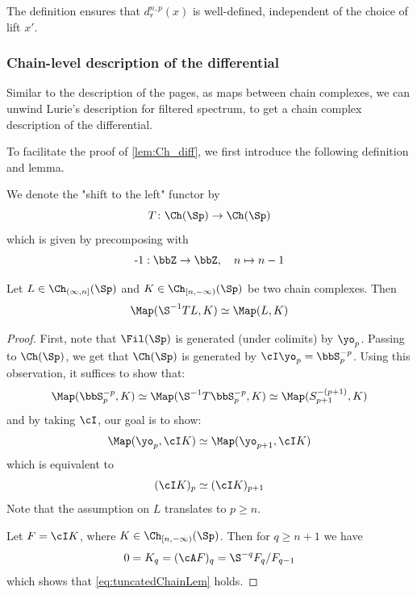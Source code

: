 The definition ensures that $d_r^{n,p}(x)$ is well-defined, independent of the choice of lift $x'$.


\subsubsection*{Chain-level description of the differential}

Similar to the description of the pages, as maps between chain complexes, we can unwind Lurie's description for filtered spectrum, to get a chain complex description of the differential.

To facilitate the proof of \cref{lem:Ch_diff}, we first introduce the following definition and lemma.

\begin{defn}
    We denote the "shift to the left" functor by 
    \begin{equation*}
        T \colon \Ch(\Sp) \to \Ch(\Sp)
    \end{equation*}
    which is given by precomposing with 
    \begin{equation*}
        \operatorname{-1}: \bbZ \to \bbZ, \quad n \mapsto n-1
    \end{equation*}
\end{defn}

\begin{lem} \label{lem:shift_map}
    Let $L \in \Ch_{(\infty,n]}(\Sp)$ and $K \in \Ch_{[n,-\infty)}(\Sp)$ be two chain complexes. Then
    \begin{equation*}
        \Map(\S^{-1} T L,K) \simeq \Map(L, K)
    \end{equation*}  
\end{lem}
\begin{proof}
    First, note that $\Fil(\Sp)$ is generated (under colimits) by $\yo_p$. Passing to $\Ch(\Sp)$, we get that $\Ch(\Sp)$ is generated by $\cI \yo_p = \bbS_p^{-p}$.
    Using this observation, it suffices to show that:
    \begin{equation*}
        \Map(\bbS_{p}^{-p}, K) \simeq \Map(\S^{-1} T \bbS_{p}^{-p},K) \simeq \Map(S_{p+1}^{-(p+1)},K)
    \end{equation*}
    and by taking $\cI$, our goal is to show:
    \begin{equation*}
        \Map(\yo_p, \cI K) \simeq \Map(\yo_{p+1},\cI K)
    \end{equation*}
    which is equivalent to
    \begin{equation}\label{eq:tuncatedChainLem}
        (\cI K)_p \simeq (\cI K)_{p+1}
    \end{equation}
    Note that the assumption on $L$ translates to $p \geq n$.

    Let $F = \cI K$, where $K \in \Ch_{[n,-\infty)}(\Sp)$. Then for $q \geq n+1$ we have
    \begin{equation*}
        0 = K_q = (\cA F)_q = \S^{-q} F_q /F_{q-1}
    \end{equation*}
    which shows that \cref{eq:tuncatedChainLem} holds.
\end{proof}

